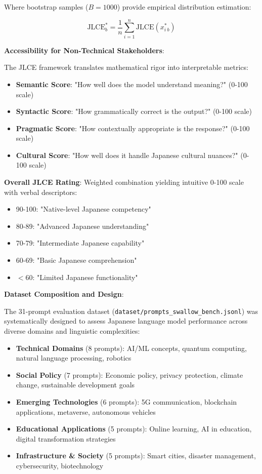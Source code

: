 \documentclass[12pt,a4paper]{article}
\begin{document}
Where bootstrap samples ($B=1000$) provide empirical distribution estimation:

\begin{equation}
\text{JLCE}^*_b = \frac{1}{n} \sum_{i=1}^{n} \text{JLCE}(x_i^{*}_b)
\end{equation}

\textbf{Accessibility for Non-Technical Stakeholders}:

The JLCE framework translates mathematical rigor into interpretable metrics:

\begin{itemize}
\item \textbf{Semantic Score}: "How well does the model understand meaning?" (0-100 scale)
\item \textbf{Syntactic Score}: "How grammatically correct is the output?" (0-100 scale)
\item \textbf{Pragmatic Score}: "How contextually appropriate is the response?" (0-100 scale)
\item \textbf{Cultural Score}: "How well does it handle Japanese cultural nuances?" (0-100 scale)
\end{itemize}

\textbf{Overall JLCE Rating}: Weighted combination yielding intuitive 0-100 scale with verbal descriptors:
\begin{itemize}
\item 90-100: "Native-level Japanese competency"
\item 80-89: "Advanced Japanese understanding"
\item 70-79: "Intermediate Japanese capability"
\item 60-69: "Basic Japanese comprehension"
\item $<60$: "Limited Japanese functionality"
\end{itemize}

\textbf{Dataset Composition and Design}:

The 31-prompt evaluation dataset (\texttt{dataset/prompts\_swallow\_bench.jsonl}) was systematically designed to assess Japanese language model performance across diverse domains and linguistic complexities:

\begin{itemize}
\item \textbf{Technical Domains} (8 prompts): AI/ML concepts, quantum computing, natural language processing, robotics
\item \textbf{Social Policy} (7 prompts): Economic policy, privacy protection, climate change, sustainable development goals
\item \textbf{Emerging Technologies} (6 prompts): 5G communication, blockchain applications, metaverse, autonomous vehicles
\item \textbf{Educational Applications} (5 prompts): Online learning, AI in education, digital transformation strategies
\item \textbf{Infrastructure \& Society} (5 prompts): Smart cities, disaster management, cybersecurity, biotechnology
\end{itemize}
\end{document}
